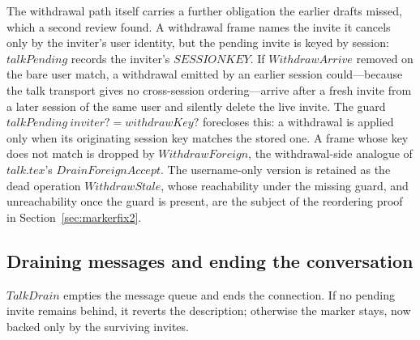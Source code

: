 \documentclass[a4paper,10pt,fleqn]{article}
\begin{document}
The withdrawal path itself carries a further obligation the earlier drafts
missed, which a second review found.  A withdrawal frame names the invite it
cancels only by the inviter's user identity, but the pending invite is keyed
by session: $talkPending$ records the inviter's $SESSIONKEY$.  If
$WithdrawArrive$ removed on the bare user match, a withdrawal emitted by an
earlier session could---because the talk transport gives no cross-session
ordering---arrive after a fresh invite from a later session of the same user
and silently delete the live invite.  The guard
$talkPending~inviter? = withdrawKey?$ forecloses this: a withdrawal is applied
only when its originating session key matches the stored one.  A frame whose
key does not match is dropped by $WithdrawForeign$, the withdrawal-side
analogue of $talk.tex$'s $DrainForeignAccept$.  The username-only version is
retained as the dead operation $WithdrawStale$, whose reachability under the
missing guard, and unreachability once the guard is present, are the subject
of the reordering proof in Section~\ref{sec:markerfix2}.

\subsection{Draining messages and ending the conversation}

$TalkDrain$ empties the message queue and ends the connection.  If no
pending invite remains behind, it reverts the description; otherwise the
marker stays, now backed only by the surviving invites.
\end{document}
